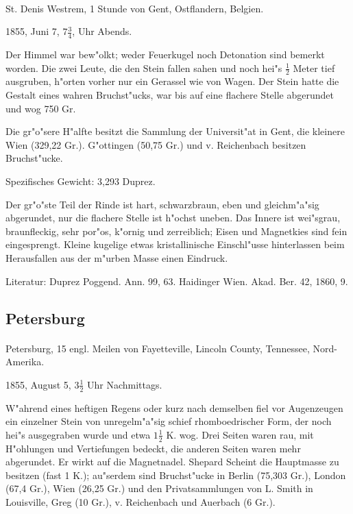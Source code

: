 \documentclass[a4paper, 11pt, oneside]{article}
\begin{document}
\paragraph{}
St. Denis Westrem, 1 Stunde von Gent, Ostflandern, Belgien.

1855, Juni 7, $7\frac{3}{4}$, Uhr Abends.

Der Himmel war bew"olkt; weder Feuerkugel noch Detonation sind bemerkt worden. Die zwei Leute, die den Stein fallen sahen und noch hei"s $\frac{1}{2}$ Meter tief ausgruben, h"orten vorher nur ein Gerassel wie von Wagen. Der Stein hatte die Gestalt eines wahren Bruchst"ucks, war bis auf eine flachere Stelle abgerundet und wog 750 Gr.

Die gr"o"sere H"alfte besitzt die Sammlung der Universit"at in Gent, die kleinere Wien (329,22 Gr.). G"ottingen (50,75 Gr.) und v. Reichenbach besitzen Bruchst"ucke.

Spezifisches Gewicht: 3,293 Duprez.

Der gr"o"ste Teil der Rinde ist hart, schwarzbraun, eben und gleichm"a"sig abgerundet, nur die flachere Stelle ist h"ochst uneben. Das Innere ist wei"sgrau, braunfleckig, sehr por"os, k"ornig und zerreiblich; Eisen und Magnetkies sind fein eingesprengt. Kleine kugelige etwas kristallinische Einschl"usse hinterlassen beim Herausfallen aus der m"urben Masse einen Eindruck.

\footnotesize
Literatur: Duprez Poggend. Ann. 99, 63. Haidinger Wien. Akad. Ber. 42, 1860, 9.

\subsection{Petersburg}
\normalsize
\paragraph{}
Petersburg, 15 engl. Meilen von Fayetteville, Lincoln County, Tennessee, Nord-Amerika.

1855, August 5, $3\frac{1}{2}$ Uhr Nachmittags.

W"ahrend eines heftigen Regens oder kurz nach demselben fiel vor Augenzeugen ein einzelner Stein von unregelm"a"sig schief rhomboedrischer Form, der noch hei"s ausgegraben wurde und etwa $1\frac{1}{2}$ K. wog. Drei Seiten waren rau, mit H"ohlungen und Vertiefungen bedeckt, die anderen Seiten waren mehr abgerundet. Er wirkt auf die Magnetnadel. Shepard Scheint die Hauptmasse zu besitzen (fast 1 K.); au"serdem sind Bruchst"ucke in Berlin (75,303 Gr.), London (67,4 Gr.), Wien (26,25 Gr.) und den Privatsammlungen von L. Smith in Louisville, Greg (10 Gr.), v. Reichenbach und Auerbach (6 Gr.).
\end{document}
